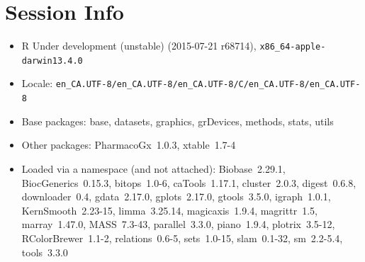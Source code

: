 \documentclass[11pt]{article}
\begin{document}
\section*{Session Info}

\begin{itemize}\raggedright
  \item R Under development (unstable) (2015-07-21 r68714), \verb|x86_64-apple-darwin13.4.0|
  \item Locale: \verb|en_CA.UTF-8/en_CA.UTF-8/en_CA.UTF-8/C/en_CA.UTF-8/en_CA.UTF-8|
  \item Base packages: base, datasets, graphics, grDevices, methods,
    stats, utils
  \item Other packages: PharmacoGx~1.0.3, xtable~1.7-4
  \item Loaded via a namespace (and not attached): Biobase~2.29.1,
    BiocGenerics~0.15.3, bitops~1.0-6, caTools~1.17.1, cluster~2.0.3,
    digest~0.6.8, downloader~0.4, gdata~2.17.0, gplots~2.17.0,
    gtools~3.5.0, igraph~1.0.1, KernSmooth~2.23-15, limma~3.25.14,
    magicaxis~1.9.4, magrittr~1.5, marray~1.47.0, MASS~7.3-43,
    parallel~3.3.0, piano~1.9.4, plotrix~3.5-12, RColorBrewer~1.1-2,
    relations~0.6-5, sets~1.0-15, slam~0.1-32, sm~2.2-5.4, tools~3.3.0
\end{itemize}


\end{document}
